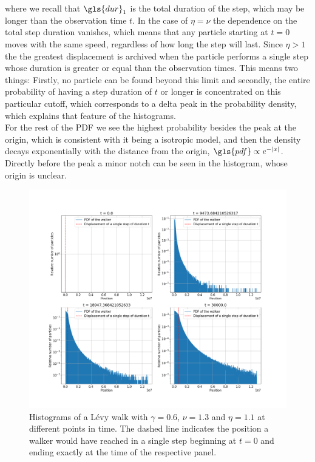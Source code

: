 % 
where we recall that $\gls{dur}_{1}$ is the total duration of the step, which may be longer than the observation time $t$. In the case of $\eta=\nu$ the dependence on the total step duration vanishes, which means that any particle starting at $t=0$ moves with the same speed, regardless of how long the step will last. Since $\eta>1$ the the greatest displacement is archived when the particle performs a single step whose duration is greater or equal than the observation times. This means two things: Firstly, no particle can be found beyond this limit and secondly, the entire probability of having a step duration of $t$ or longer is concentrated on this particular cutoff, which corresponds to a delta peak in the probability density, which explains that feature of the histograms. \\
For the rest of the \gls{PDF} we see the highest probability besides the peak at the origin, which is consistent with it being a isotropic model, and then the density decays exponentially with the distance from the origin, $\gls{pdf} \propto e^{-|x|}$. Directly before the peak a minor notch can be seen in the histogram, whose origin is unclear.  \\
%
\begin{figure}[!htb] %
\begin{center}
\includegraphics[width=1\textwidth]{pics/histogramShapeEtaSmall.png}
\caption{Histograms of a L\'evy walk with $\gamma =0.6$, $\nu = 1.3$ and $\eta =1.1$ at different points in time. The dashed line indicates the position a walker would have reached in a single step beginning at $t=0$ and ending exactly at the time of the respective panel.
\label{fig:histogramShapeEtaSmall} }
\end{center}
\end{figure} 


